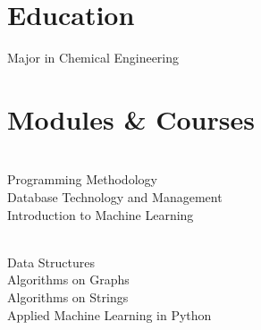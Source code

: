 \documentclass[]{resume}
\begin{document}
\sectionsep


\section{Education} 
\sectionsep
Major in Chemical Engineering

\sectionsep



\section{Modules \& Courses} 

\begin{minipage}[t]{0.4\textwidth} 
    \sectionsep \\
    Programming Methodology \textbullet{}\\
    Database Technology and Management \textbullet{}\\
    Introduction to Machine Learning \\
\end{minipage} 
\hfill\vline\hfill
\begin{minipage}[t]{0.55\textwidth} 
    \sectionsep \\
    Data Structures \textbullet{}\\
    Algorithms on Graphs \textbullet{}\\
    Algorithms on Strings \textbullet{}\\
    Applied Machine Learning in Python \\
\end{minipage}
 
\end{document}
